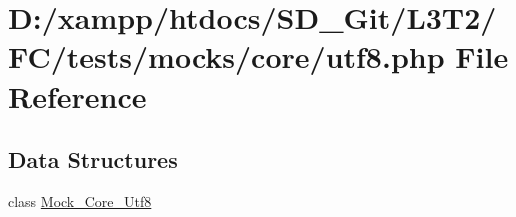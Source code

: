 \hypertarget{tests_2mocks_2core_2_utf8_8php}{}\section{D\+:/xampp/htdocs/\+S\+D\+\_\+\+Git/\+L3\+T2/\+F\+C/tests/mocks/core/utf8.php File Reference}
\label{tests_2mocks_2core_2_utf8_8php}
\subsection*{Data Structures}
\begin{DoxyCompactItemize}
\item 
class \hyperlink{class_mock___core___utf8}{Mock\+\_\+\+Core\+\_\+\+Utf8}
\end{DoxyCompactItemize}

